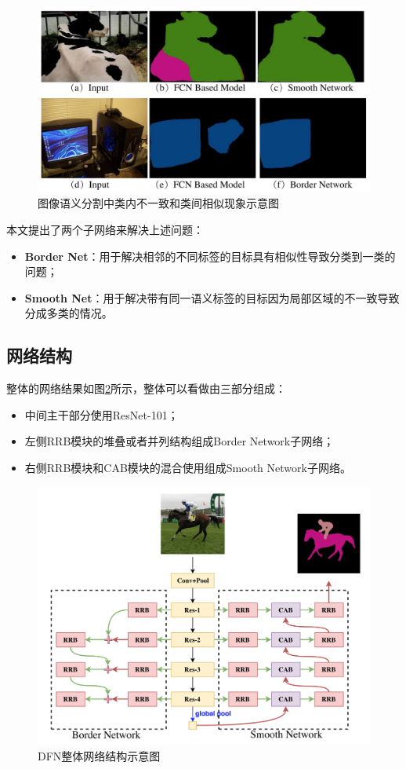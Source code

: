 \documentclass[cn]{elegantbook}
\begin{document}
\begin{figure}[h]
	\centering
	\includegraphics[width=\textwidth]{images/dfn}
	\caption{\label{dfn}图像语义分割中类内不一致和类间相似现象示意图}
\end{figure}

本文提出了两个子网络来解决上述问题：
\begin{itemize}
	\item \textbf{Border Net}：用于解决相邻的不同标签的目标具有相似性导致分类到一类的问题；
	\item \textbf{Smooth Net}：用于解决带有同一语义标签的目标因为局部区域的不一致导致分成多类的情况。
\end{itemize}

\subsection{网络结构}
整体的网络结果如图\ref{dfnnet}所示，整体可以看做由三部分组成：
\begin{itemize}
	\item 中间主干部分使用ResNet-101；
	\item 左侧RRB模块的堆叠或者并列结构组成Border Network子网络；
	\item 右侧RRB模块和CAB模块的混合使用组成Smooth Network子网络。
\end{itemize}
\begin{figure}[!h]
	\centering
	\includegraphics[width=\textwidth]{images/dfnnet}
	\caption{\label{dfnnet}DFN整体网络结构示意图}
\end{figure}
\end{document}
